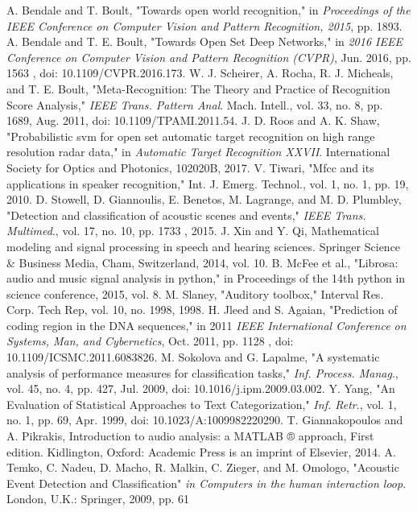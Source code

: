 \documentclass{ieeeaccess}
\begin{document}
\begin{thebibliography}{00}
	A. Bendale and T. Boult, "Towards open world recognition," in \textit{Proceedings of the IEEE Conference on Computer Vision and Pattern Recognition, 2015}, pp. 1893.
	A. Bendale and T. E. Boult, "Towards Open Set Deep Networks," in \textit{2016 IEEE Conference on Computer Vision and Pattern Recognition (CVPR)}, Jun. 2016, pp. 1563 , doi: 10.1109/CVPR.2016.173.
	W. J. Scheirer, A. Rocha, R. J. Micheals, and T. E. Boult, "Meta-Recognition: The Theory and Practice of Recognition Score Analysis," \textit{IEEE Trans. Pattern Anal}. Mach. Intell., vol. 33, no. 8, pp. 1689, Aug. 2011, doi: 10.1109/TPAMI.2011.54.
	J. D. Roos and A. K. Shaw, "Probabilistic svm for open set automatic target recognition on high range resolution radar data," in \textit{Automatic Target Recognition XXVII}. International Society for Optics and Photonics, 102020B, 2017. 
	V. Tiwari, "Mfcc and its applications in speaker recognition," Int. J. Emerg. Technol., vol. 1, no. 1, pp. 19, 2010.
	D. Stowell, D. Giannoulis, E. Benetos, M. Lagrange, and M. D. Plumbley, "Detection and classification of acoustic scenes and events," \textit{IEEE Trans. Multimed}., vol. 17, no. 10, pp. 1733 , 2015.
	J. Xin and Y. Qi, Mathematical modeling and signal processing in speech and hearing sciences. Springer Science \& Business Media, Cham, Switzerland, 2014, vol. 10.
	B. McFee et al., "Librosa: audio and music signal analysis in python," in Proceedings of the 14th python in science conference, 2015, vol. 8.
	M. Slaney, "Auditory toolbox," Interval Res. Corp. Tech Rep, vol. 10, no. 1998, 1998.
	H. Jleed and S. Agaian, "Prediction of coding region in the DNA sequences," in 2011 \textit{IEEE International Conference on Systems, Man, and Cybernetics}, Oct. 2011, pp. 1128 , doi: 10.1109/ICSMC.2011.6083826.
	M. Sokolova and G. Lapalme, "A systematic analysis of performance measures for classification tasks," \textit{Inf. Process. Manag}., vol. 45, no. 4, pp. 427, Jul. 2009, doi: 10.1016/j.ipm.2009.03.002.
	Y. Yang, "An Evaluation of Statistical Approaches to Text Categorization," \textit{Inf. Retr}., vol. 1, no. 1, pp. 69, Apr. 1999, doi: 10.1023/A:1009982220290.
	T. Giannakopoulos and A. Pikrakis, Introduction to audio analysis: a MATLAB ® approach, First edition. Kidlington, Oxford: Academic Press is an imprint of Elsevier, 2014.
	A. Temko, C. Nadeu, D. Macho, R. Malkin, C. Zieger, and M. Omologo, "Acoustic Event Detection and Classification" \textit{in Computers in the human interaction loop}. London, U.K.: Springer, 2009, pp. 61

\end{thebibliography}
\end{document}
